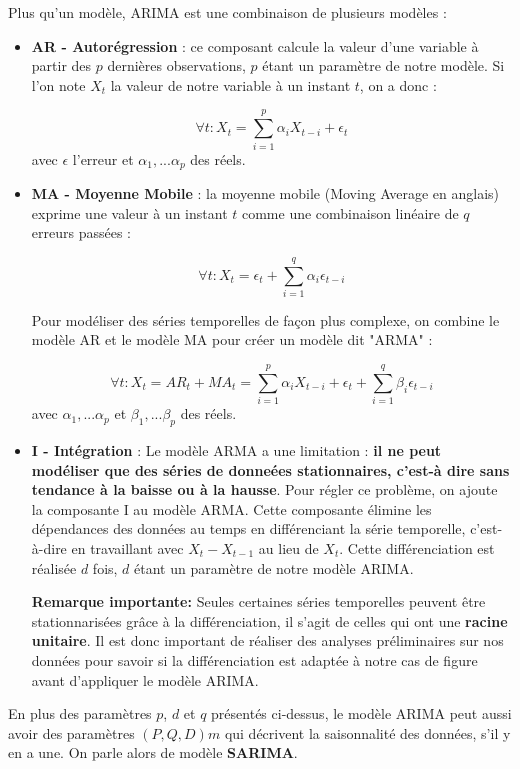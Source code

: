 \documentclass[french]{article}
\begin{document}
    Plus qu'un modèle, ARIMA est une combinaison de plusieurs modèles :
    \begin{itemize}
        \item \textbf{AR - Autorégression} : ce composant calcule la valeur d'une variable à partir des $p$ dernières observations, $p$ étant un paramètre de notre modèle. Si l'on note $X_t$ la valeur de notre variable à un instant $t$, on a donc :

        \begin{equation}\forall t : X_t = \sum_{i=1}^p \alpha_i X_{t-i} + \epsilon_t \end{equation}
        avec $\epsilon$ l'erreur et $\alpha_1,...\alpha_p$ des réels.
        \item \textbf{MA - Moyenne Mobile} : la moyenne mobile (Moving Average en anglais) exprime une valeur à un instant $t$ comme une combinaison linéaire de $q$ erreurs passées :

        \begin{equation}\forall t : X_t = \epsilon_t + \sum_{i=1}^q \alpha_i \epsilon_{t-i} \end{equation}

        Pour modéliser des séries temporelles de façon plus complexe, on combine le modèle AR et le modèle MA pour créer un modèle dit "ARMA" :

        \begin{equation}\forall t : X_t = AR_t + MA_t = \sum_{i=1}^p \alpha_i X_{t-i} + \epsilon_t + \sum_{i=1}^q \beta_i \epsilon_{t-i} \end{equation}
        avec $\alpha_1,...\alpha_p$ et $\beta_1,...\beta_p$ des réels.
        \item \textbf{I - Intégration} : Le modèle ARMA a une limitation : \textbf{il ne peut modéliser que des séries de donneées stationnaires, c'est-à dire sans tendance à la baisse ou à la hausse}. Pour régler ce problème, on ajoute la composante I au modèle ARMA.
        Cette composante élimine les dépendances des données au temps en différenciant la série temporelle, c'est-à-dire en travaillant avec $X_t - X_{t-1}$ au lieu de $X_t$. Cette différenciation est réalisée $d$ fois, $d$ étant un paramètre de notre modèle ARIMA.

        \textbf{Remarque importante: }Seules certaines séries temporelles peuvent être stationnarisées grâce à la différenciation, il s'agit de celles qui ont une \textbf{racine unitaire}. Il est donc important de réaliser des analyses préliminaires sur nos données pour savoir si la différenciation est adaptée à notre cas de figure avant d'appliquer le modèle ARIMA.

    \end{itemize}
    En plus des paramètres $p$, $d$ et $q$ présentés ci-dessus, le modèle ARIMA peut aussi avoir des paramètres $(P, Q, D)m$ qui décrivent la saisonnalité des données, s'il y en a une. On parle alors de modèle \textbf{SARIMA}.
    
\end{document}
